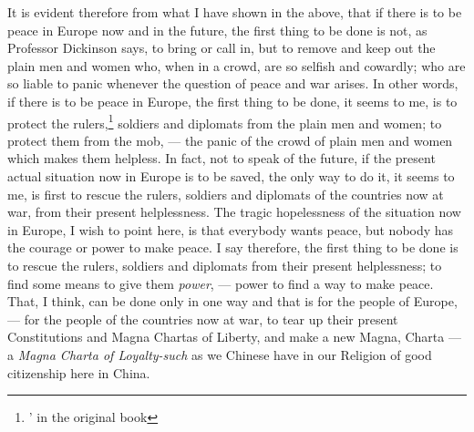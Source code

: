 It is evident therefore from what I have shown in the above, that if there is to be peace in Europe now and in the future, the first thing to be done is not, as Professor Dickinson says, to bring or call in, but to remove and keep out the plain men and women who, when in a crowd, are so selfish and cowardly; who are so liable to panic whenever the question of peace and war arises.
In other words, if there is to be peace in Europe, the first thing to be done, it seems to me, is to protect the rulers,\footnote{' in the original book} soldiers and diplomats from the plain men and women; to protect them from the mob, --- the panic of the crowd of plain men and women which makes them helpless.
In fact, not to speak of the future, if the present actual situation now in Europe is to be saved, the only way to do it, it seems to me, is first to rescue the rulers, soldiers and diplomats of the countries now at war, from their present helplessness.
The tragic hopelessness of the situation now in Europe, I wish to point here, is that everybody wants peace, but nobody has the courage or power to make peace.
I say therefore, the first thing to be done is to rescue the rulers, soldiers and diplomats from their present helplessness; to find some means to give them \emph{power}, --- power to find a way to make peace.
That, I think, can be done only in one way and that is for the people of Europe, --- for the people of the countries now at war, to tear up their present Constitutions and Magna Chartas of Liberty, and make a new Magna, Charta --- a \emph{Magna Charta of Loyalty-such}  as we Chinese have in our Religion of good citizenship here in China.

